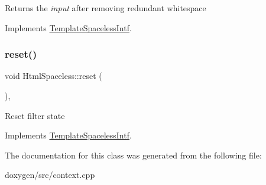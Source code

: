 Returns the {\itshape input} after removing redundant whitespace 

Implements \mbox{\hyperlink{class_template_spaceless_intf_aa68919027a4736005174cbdf9159a8a9}{Template\+Spaceless\+Intf}}.

\mbox{\label{class_html_spaceless_af7774a1e0cda214f1d50e05dfb52be0b}} 
\subsubsection{\texorpdfstring{reset()}{reset()}}
{\footnotesize\ttfamily void Html\+Spaceless\+::reset (\begin{DoxyParamCaption}{ }\end{DoxyParamCaption})\hspace{0.3cm}{\ttfamily [inline]}, {\ttfamily [virtual]}}

Reset filter state 

Implements \mbox{\hyperlink{class_template_spaceless_intf_ae6f581a16baa634124ab2e798cc4064c}{Template\+Spaceless\+Intf}}.



The documentation for this class was generated from the following file\+:\begin{DoxyCompactItemize}
\item 
doxygen/src/context.\+cpp\end{DoxyCompactItemize}
